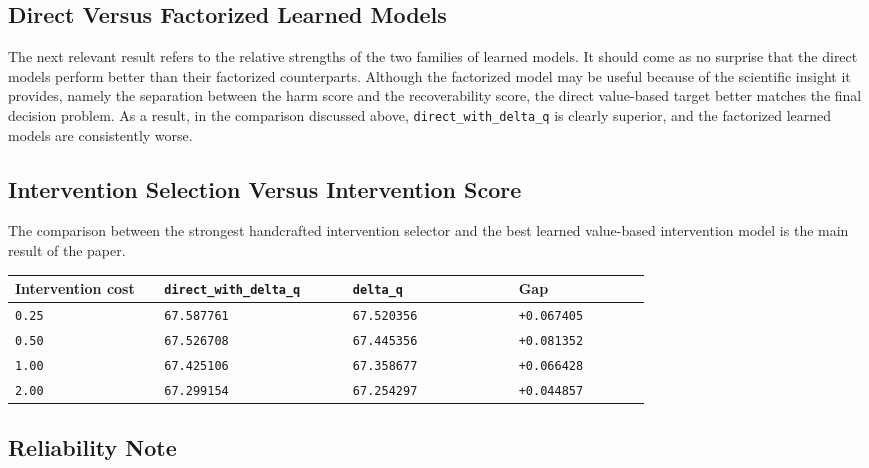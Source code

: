 \documentclass[11pt]{article}
\begin{document}
\subsection*{Direct Versus Factorized Learned Models}

The next relevant result refers to the relative strengths of the two families of learned models. It should come as no surprise that the direct models perform better than their factorized counterparts. Although the factorized model may be useful because of the scientific insight it provides, namely the separation between the harm score and the recoverability score, the direct value-based target better matches the final decision problem. As a result, in the comparison discussed above, \texttt{direct\_with\_delta\_q} is clearly superior, and the factorized learned models are consistently worse.

\subsection*{Intervention Selection Versus Intervention Score}

The comparison between the strongest handcrafted intervention selector and the best learned value-based intervention model is the main result of the paper.

\begin{table}[h]
\centering
\small
\begin{tabular}{>{\raggedright\arraybackslash}p{0.18\linewidth}>{\raggedright\arraybackslash}p{0.20\linewidth}>{\raggedright\arraybackslash}p{0.20\linewidth}>{\raggedright\arraybackslash}p{0.16\linewidth}}
\toprule
Intervention cost & {\scriptsize\texttt{direct\_with\_delta\_q}} & \texttt{delta\_q} & Gap \\
\midrule
\texttt{0.25} & \texttt{67.587761} & \texttt{67.520356} & \texttt{+0.067405} \\
\texttt{0.50} & \texttt{67.526708} & \texttt{67.445356} & \texttt{+0.081352} \\
\texttt{1.00} & \texttt{67.425106} & \texttt{67.358677} & \texttt{+0.066428} \\
\texttt{2.00} & \texttt{67.299154} & \texttt{67.254297} & \texttt{+0.044857} \\
\bottomrule
\end{tabular}
\end{table}

\subsection*{Reliability Note}
\end{document}
